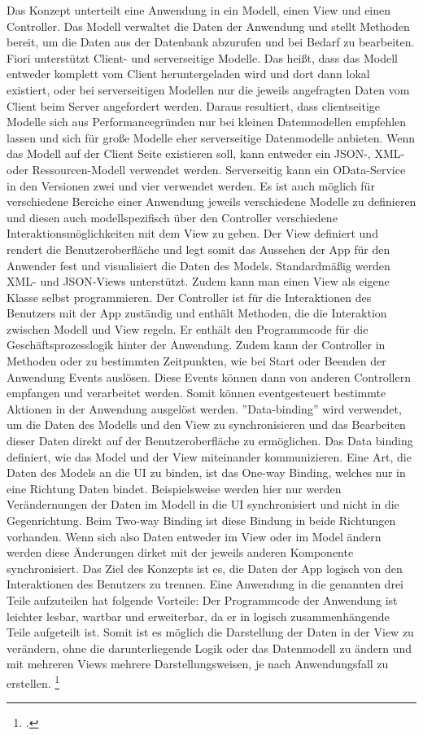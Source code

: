 Das Konzept unterteilt eine Anwendung in ein Modell, einen View und einen Controller. Das Modell verwaltet die Daten der Anwendung und stellt Methoden bereit, um die Daten aus der Datenbank abzurufen und bei Bedarf zu bearbeiten. Fiori unterstützt Client- und serverseitige Modelle. Das hei{\ss}t, dass das Modell entweder komplett vom Client heruntergeladen wird und dort dann lokal existiert, oder bei serverseitigen Modellen nur die jeweils angefragten Daten vom Client beim Server angefordert werden. Daraus resultiert, dass clientseitige Modelle sich aus Performancegründen nur bei kleinen Datenmodellen empfehlen lassen und sich für gro{\ss}e Modelle eher serverseitige Datenmodelle anbieten. Wenn das Modell auf der Client Seite existieren soll, kann entweder ein JSON-, XML- oder Ressourcen-Modell verwendet werden. Serverseitig kann ein OData-Service in den Versionen zwei und vier verwendet werden. Es ist auch möglich für verschiedene Bereiche einer Anwendung jeweils verschiedene Modelle zu definieren und diesen auch modellspezifisch über den Controller verschiedene Interaktionsmöglichkeiten mit dem View zu geben. Der View definiert und rendert die Benutzeroberfläche und legt somit das Aussehen der App für den Anwender fest und visualisiert die Daten des Models. Standardmä{\ss}ig werden XML- und JSON-Views unterstützt. Zudem kann man einen View als eigene Klasse selbst programmieren. Der Controller ist für die Interaktionen des Benutzers mit der App zuständig und enthält Methoden, die die Interaktion zwischen Modell und View regeln. Er enthält den Programmcode für die Geschäftsprozesslogik hinter der Anwendung. Zudem kann der Controller in Methoden oder zu bestimmten Zeitpunkten, wie \zB bei Start oder Beenden der Anwendung Events auslösen. Diese Events können dann von anderen Controllern empfangen und verarbeitet werden. Somit können eventgesteuert bestimmte Aktionen in der Anwendung ausgelöst werden. ''Data-binding'' wird verwendet, um die Daten des Modells und den View zu synchronisieren und das Bearbeiten dieser Daten direkt auf der Benutzeroberfläche zu ermöglichen. Das Data binding definiert, wie das Model und der View miteinander kommunizieren. Eine Art, die Daten des Models an die UI zu binden, ist das One-way Binding, welches nur in eine Richtung Daten bindet. Beispielsweise werden hier nur werden Verändernungen der Daten im Modell in die UI synchronisiert und nicht in die Gegenrichtung. Beim Two-way Binding ist diese Bindung in beide Richtungen vorhanden. Wenn sich also Daten entweder im View oder im Model ändern werden diese Änderungen dirket mit der jeweils anderen Komponente synchronisiert. Das Ziel des Konzepts ist es, die Daten der App logisch von den Interaktionen des Benutzers zu trennen. Eine Anwendung in die genannten drei Teile aufzuteilen hat folgende Vorteile: Der Programmcode der Anwendung ist leichter lesbar, wartbar und erweiterbar, da er in logisch zusammenhängende Teile aufgeteilt ist. Somit ist es möglich die Darstellung der Daten in der View zu verändern, ohne die darunterliegende Logik oder das Datenmodell zu ändern und mit mehreren Views mehrere Darstellungsweisen, je nach Anwendungsfall zu erstellen. \footcite[Vgl.][]{sap_sapui5-sap-hel-docu_2023}

